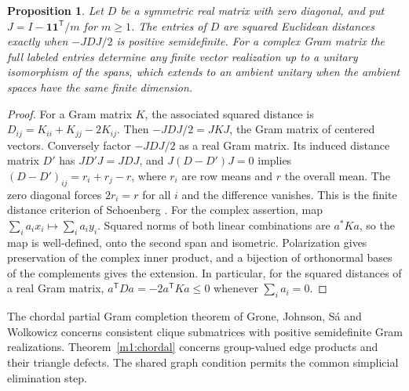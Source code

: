 \documentclass[11pt,reqno]{amsart}
\newtheorem{proposition}[theorem]{Proposition}
\theoremstyle{definition}
\theoremstyle{remark}
\numberwithin{equation}{section}
\begin{document}
\begin{proposition}\label{m1:distance}
Let \(D\) be a symmetric real matrix with zero diagonal, and put
\(J=I-\mathbf 1\mathbf 1^{\mathsf T}/m\) for \(m\ge1\).
The entries of \(D\) are squared Euclidean distances exactly when
\(-JDJ/2\) is positive semidefinite. For a complex Gram matrix the
full labeled entries determine any finite vector realization
up to a unitary isomorphism of the spans, which extends to an
ambient unitary when the ambient spaces have the same finite
dimension.
\end{proposition}
\begin{proof}
For a Gram matrix \(K\), the associated squared distance is
\(D_{ij}=K_{ii}+K_{jj}-2K_{ij}\). Then
\(-JDJ/2=JKJ\), the Gram matrix of centered vectors.
Conversely factor \(-JDJ/2\) as a real Gram matrix. Its induced
distance matrix \(D'\) has \(JD'J=JDJ\), and
\(J(D-D')J=0\) implies
\((D-D')_{ij}=r_i+r_j-r\), where \(r_i\) are row means and \(r\)
the overall mean. The zero diagonal forces \(2r_i=r\) for all
\(i\) and the difference vanishes. This is the finite
distance criterion of Schoenberg \cite{m1:Schoenberg}.
For the complex assertion, map
\(\sum_i a_i x_i\mapsto\sum_i a_i y_i\).
Squared norms of both linear combinations are \(a^*Ka\), so
the map is well-defined, onto the second span and isometric.
Polarization gives preservation of the complex inner product,
and a bijection of orthonormal bases of the complements gives
the extension. In particular, for the squared distances of a
real Gram matrix, \(a^{\mathsf T}Da=-2a^{\mathsf T}Ka\le0\)
whenever \(\sum_i a_i=0\).
\end{proof}

The chordal partial Gram completion theorem of Grone, Johnson,
S\'a and Wolkowicz \cite{m1:Grone} concerns consistent clique
submatrices with positive semidefinite Gram realizations.
Theorem~\ref{m1:chordal} concerns group-valued edge products
and their triangle defects. The shared graph condition permits
the common simplicial elimination step.
\end{document}
